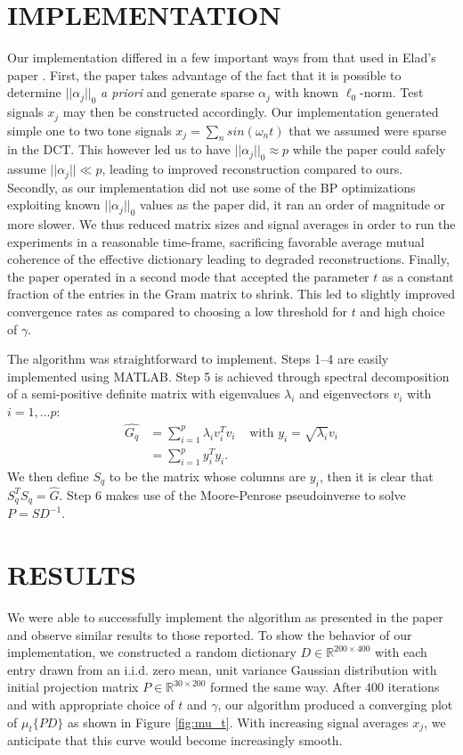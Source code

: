 \documentclass[journal]{IEEEtran}
\begin{document}
\section{IMPLEMENTATION}

Our implementation differed in a few important ways from that used in Elad's paper \cite{elad}.  First, the paper takes advantage of the fact that it is possible to determine $|| \alpha_j ||_0$ \emph{a priori} and generate sparse $\alpha_j$ with known $\ell_0$-norm.  Test signals $x_j$ may then be constructed accordingly.  Our implementation generated simple one to two tone signals $x_j = \sum_n sin(\omega_n t)$ that we assumed were sparse in the DCT.  This however led us to have $||\alpha_j||_0 \approx p$ while the paper could safely assume $ ||\alpha_j|| \ll p$, leading to improved reconstruction compared to ours.  Secondly, as our implementation did not use some of the BP optimizations exploiting known $||\alpha_j||_0$ values as the paper did, it ran an order of magnitude or more slower.  We thus reduced matrix sizes and signal averages in order to run the experiments in a reasonable time-frame, sacrificing favorable average mutual coherence of the effective dictionary leading to degraded reconstructions.  Finally, the paper operated in a second mode that accepted the parameter $t$ as a constant fraction of the entries in the Gram matrix to shrink.  This led to slightly improved convergence rates as compared to choosing a low threshold for $t$ and high choice of $\gamma$.

The algorithm was straightforward to implement.  Steps 1--4 are easily implemented using MATLAB.  Step 5 is achieved through spectral decomposition of a semi-positive definite matrix with eigenvalues $\lambda_i$ and eigenvectors $v_i$ with $i = 1, \ldots p$: $$ \begin{aligned} \hat{G_q} &= \sum_{i=1}^p \lambda_i v_i^T v_i & \mbox{ with } y_i = \sqrt{\lambda_i} v_i \\ &= \sum_{i=1}^p y_i^T y_i.  \end{aligned} $$  We then define $S_q$ to be the matrix whose columns are $y_i$, then it is clear that $S_q^T S_q = \hat{G}$.  Step 6 makes use of the Moore-Penrose pseudoinverse to solve $ P = S D^{-1} $.

\section{RESULTS}

We were able to successfully implement the algorithm as presented in the paper and observe similar results to those reported.  To show the behavior of our implementation, we constructed a random dictionary $D \in \mathbb{R}^{200 \times 400} $ with each entry drawn from an i.i.d. zero mean, unit variance Gaussian distribution with initial projection matrix $P \in \mathbb{R}^{30 \times 200}$ formed the same way.  After $400$ iterations and with appropriate choice of $t$ and $\gamma$, our algorithm produced a converging plot of $\mu_t\{PD\}$ as shown in Figure \ref{fig:mu_t}.  With increasing signal averages $x_j$, we anticipate that this curve would become increasingly smooth.
\end{document}
